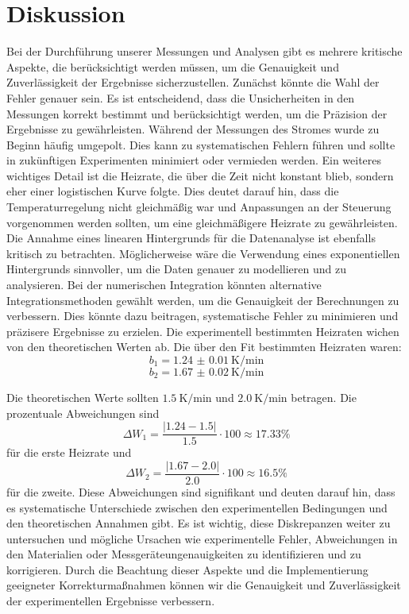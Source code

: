 \section{Diskussion}
\label{sec:Diskussion}
Bei der Durchführung unserer Messungen und Analysen gibt es mehrere kritische Aspekte, 
die berücksichtigt werden müssen, um die Genauigkeit und Zuverlässigkeit der Ergebnisse sicherzustellen.
Zunächst könnte die Wahl der Fehler genauer sein. Es ist entscheidend, dass die Unsicherheiten
in den Messungen korrekt bestimmt und berücksichtigt werden, um die Präzision der Ergebnisse zu gewährleisten.
Während der Messungen des Stromes wurde zu Beginn häufig umgepolt. Dies kann zu systematischen Fehlern führen 
und sollte in zukünftigen Experimenten minimiert oder vermieden werden.
Ein weiteres wichtiges Detail ist die Heizrate, die über die Zeit nicht konstant blieb, sondern eher einer logistischen Kurve folgte.
Dies deutet darauf hin, dass die Temperaturregelung nicht gleichmäßig war und Anpassungen an der Steuerung vorgenommen werden sollten, 
um eine gleichmäßigere Heizrate zu gewährleisten. Die Annahme eines linearen Hintergrunds für die Datenanalyse ist ebenfalls
kritisch zu betrachten. Möglicherweise wäre die Verwendung eines exponentiellen Hintergrunds sinnvoller, um die Daten genauer zu 
modellieren und zu analysieren. Bei der numerischen Integration könnten alternative Integrationsmethoden gewählt werden, um die
Genauigkeit der Berechnungen zu verbessern. Dies könnte dazu beitragen, systematische Fehler zu minimieren und präzisere Ergebnisse zu erzielen.
Die experimentell bestimmten Heizraten wichen von den theoretischen Werten ab. Die über den Fit bestimmten Heizraten waren:
\begin{equation}
b_1 =  \qty{1.24(1)}{\kelvin\per\minute}
\end{equation}
\begin{equation}
b_2 = \qty{1.67(2)}{\kelvin\per\minute}
\end{equation}

Die theoretischen Werte sollten $\qty{1.5}{\kelvin\per\minute}$ und $\qty{2.0}{\kelvin\per\minute}$ betragen.
Die prozentuale Abweichungen sind
\begin{equation}
    \Delta W_1= \frac{|1.24 - 1.5|}{1.5} \cdot100 \approx17.33\%
\end{equation}
für die erste Heizrate und
\begin{equation}
    \Delta W_2= \frac{|1.67 - 2.0|}{2.0} \cdot100 \approx16.5\%
\end{equation}
für die zweite. 
Diese Abweichungen sind signifikant und deuten darauf hin, dass es systematische Unterschiede zwischen den experimentellen 
Bedingungen und den theoretischen Annahmen gibt. Es ist wichtig, diese Diskrepanzen weiter zu untersuchen und mögliche 
Ursachen wie experimentelle Fehler, Abweichungen in den Materialien oder Messgeräteungenauigkeiten zu identifizieren und zu korrigieren.
Durch die Beachtung dieser Aspekte und die Implementierung geeigneter Korrekturmaßnahmen können wir die Genauigkeit und
Zuverlässigkeit der experimentellen Ergebnisse verbessern.